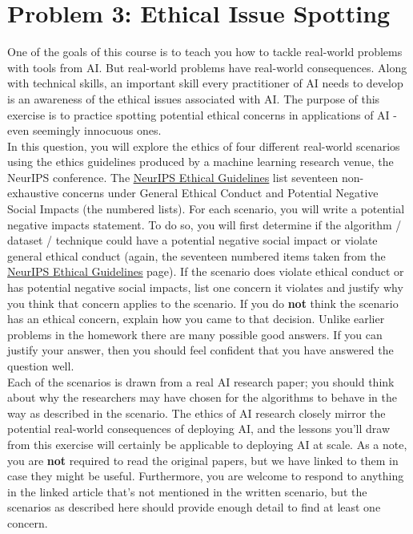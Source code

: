 \documentclass{article}
\theoremstyle{case}
\theoremstyle{definition}
\begin{document}
\section*{Problem 3: Ethical Issue Spotting}
One of the goals of this course is to teach you how to tackle real-world problems with tools from AI.  But real-world problems have real-world consequences. Along with technical skills, an important skill every practitioner of AI needs to develop is an awareness of the ethical issues associated with AI. The purpose of this exercise is to practice spotting potential ethical concerns in applications of AI - even seemingly innocuous ones. \\
In this question, you will explore the ethics of four different real-world scenarios using the ethics guidelines produced by a machine learning research venue, the NeurIPS conference. The \underline{\href{https://nips.cc/Conferences/2023/EthicsGuidelinesForReviewers}{NeurIPS Ethical Guidelines}} list seventeen non-exhaustive concerns under General Ethical Conduct  and Potential Negative Social Impacts (the numbered lists). For each scenario, you will write a potential negative impacts statement. To do so, you will first determine if the algorithm / dataset / technique could have a potential negative
social impact or violate general ethical conduct (again, the seventeen numbered items taken from the \underline{\href{https://nips.cc/Conferences/2023/EthicsGuidelinesForReviewers}{NeurIPS Ethical Guidelines}} page). If the scenario does violate ethical conduct or has potential negative social impacts, list one concern it violates and justify why you think that concern applies to the scenario. If you do \textbf{not} think the scenario has an ethical concern, explain how you came to that decision. 
Unlike earlier problems in the homework there are many possible good answers. If you can justify your answer, then you should feel confident that you have answered the question well. \\
Each of the scenarios is drawn from a real AI research paper; you should think about why the researchers may have chosen for the algorithms to behave in the way as described in the scenario. The ethics of AI research closely mirror the potential real-world consequences of deploying AI, and the lessons you’ll draw from this exercise will certainly be applicable to deploying AI at scale. As a note, you are \textbf{not} required to read the original papers, but we have linked to them in case they might be useful. Furthermore, you are welcome to respond to anything in the linked article that's not mentioned in the written scenario, but the scenarios as described here should provide enough detail to find at least one concern.
\end{document}
